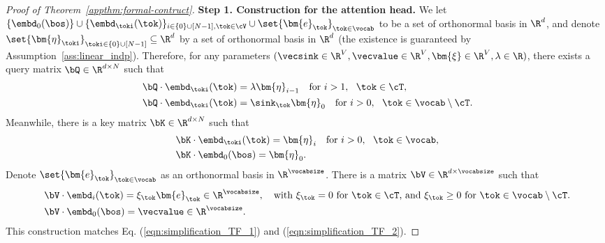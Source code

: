 \begin{proof}[Proof of Theorem~\ref{appthm:formal-contruct}]
\noindent
{\bf Step 1. Construction for the attention head.} We let $\{\embd_0(\bos)\} \cup \{ \embd_\toki(\tok) \}_{i \in \{ 0 \} \cup [N-1], \tok \in \cV} \cup \set{\bm{e}_\tok}_{\tok\in\vocab}$ to be a set of orthonormal basis in $\R^d$, and denote $\set{\bm{\eta}_\toki}_{\toki\in\{ 0 \} \cup [N-1]} \subseteq \R^d$ by a set of orthonormal basis in $\R^d$ (the existence is guaranteed by Assumption~\ref{ass:linear_indp}). Therefore, for any parameters $(\vecsink \in \R^{V}, \vecvalue \in \R^V, \bm{\xi} \in \R^V, \lambda \in \R)$, there exists a query matrix $\bQ \in \R^{d \times N}$ such that
\begin{equation}\label{appeqn:mlp-construct}
\begin{aligned}
&~\bQ \cdot \embd_\toki(\tok) = \lambda\bm{\eta}_{i-1}~~~\text{for }i>1,~~\tok\in\cT,\\
&~\bQ \cdot \embd_\toki(\tok) = \sink_{\tok} \bm{\eta}_{0}~~~\text{for }i>0,~~\tok\in\vocab\setminus\cT.\\
\end{aligned}
\end{equation}
Meanwhile, there is a key matrix $\bK \in \R^{d \times N}$ such that
\begin{equation}
\begin{aligned}
&~\bK \cdot \embd_\toki(\tok) = \bm{\eta}_{i}~~~\text{for }i>0,~~\tok\in\vocab,\\
&~\bK \cdot \embd_0(\bos) = \bm{\eta}_{0}.
\end{aligned}
\end{equation}
Denote $\set{\bm{e}_\tok}_{\tok\in\vocab}$ as an orthonormal basis in $\R^\vocabsize$.
There is a matrix $\bV\in \R^{d \times \vocabsize}$ such that %
\begin{equation}
\begin{aligned}
&~ \bV \cdot \embd_i(\tok)  = \xi_\tok \bm{e}_{\tok} \in \R^{\vocabsize},  ~~~\text{with $\xi_\tok=0$ for $\tok\in\cT$, and $\xi_\tok\geq 0$ for $\tok\in\vocab\setminus\cT$.}\\
&~ \bV \cdot \embd_0(\bos) = \vecvalue\in\R^\vocabsize.\\
\end{aligned}
\end{equation}
This construction matches Eq. (\ref{eqn:simplification_TF_1}) and (\ref{eqn:simplification_TF_2}). 


\end{proof}
